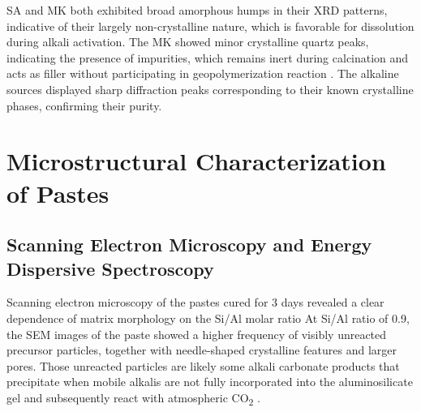 SA and MK both exhibited broad amorphous humps in their XRD patterns, indicative of their largely non-crystalline nature, which is favorable for dissolution during alkali activation.
The MK showed minor crystalline quartz peaks, indicating the presence of impurities, which remains inert during calcination \cite{provis2014geopolymers} and acts as filler without participating in geopolymerization reaction \cite{rakhimova2019metakaolin}.
The alkaline sources displayed sharp diffraction peaks corresponding to their known crystalline phases, confirming their purity.

\section{Microstructural Characterization of Pastes}

\subsection{Scanning Electron Microscopy and Energy Dispersive Spectroscopy}

Scanning electron microscopy of the pastes cured for 3 days revealed a clear dependence of matrix morphology on the Si/Al molar ratio
At Si/Al ratio of 0.9, the SEM images of the paste showed a higher frequency of visibly unreacted precursor particles, together with needle-shaped crystalline features and larger pores. Those unreacted particles are likely some alkali carbonate products that precipitate when mobile alkalis are not fully incorporated into the aluminosilicate gel and subsequently react with atmospheric CO\textsubscript{2} \cite{provis2018alkali}.

